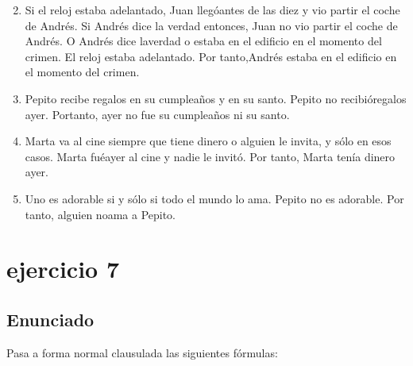 \documentclass[a4paper,10pt]{article}
\begin{document}
\begin{enumerate}
\begin{itemize}
$$	\end{itemize}
	\item Si el reloj estaba adelantado, Juan llegóantes de las diez y vio partir el coche de Andrés. Si Andrés   dice   la   verdad   entonces,   Juan   no   vio   partir   el   coche   de   Andrés.   O   Andrés   dice   laverdad o estaba en el edificio en el momento del crimen. El reloj estaba adelantado. Por tanto,Andrés estaba en el edificio en el momento del crimen.
	\item Pepito  recibe   regalos  en  su  cumpleaños  y  en  su  santo.  Pepito   no  recibióregalos   ayer.  Portanto, ayer no fue su cumpleaños ni su santo.
	\item Marta va al cine siempre que tiene dinero o alguien le invita, y sólo en esos
	casos. Marta fuéayer al cine y nadie le invitó. Por tanto, Marta tenía dinero ayer.
	\item Uno es adorable si y sólo si todo el mundo lo ama. Pepito no es adorable. Por tanto, alguien noama a Pepito.

\end{enumerate}


\vspace{1cm}
\section{ejercicio 7}
\subsection{Enunciado}
Pasa a forma normal clausulada las siguientes fórmulas:
\end{document}
